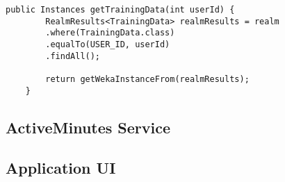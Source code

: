      \begin{lstlisting}[caption= Accessing database tables, label=accessing_database_tables,frame=tlrbr,basicstyle=\small,captionpos=b]
   public Instances getTrainingData(int userId) {
        RealmResults<TrainingData> realmResults = realm
        .where(TrainingData.class)
        .equalTo(USER_ID, userId)
        .findAll();
        
        return getWekaInstanceFrom(realmResults);
    }
    \end{lstlisting}
    
    
    
    \subsection{ActiveMinutes Service}
    
    \subsection{Application UI}  




    
    
    
    